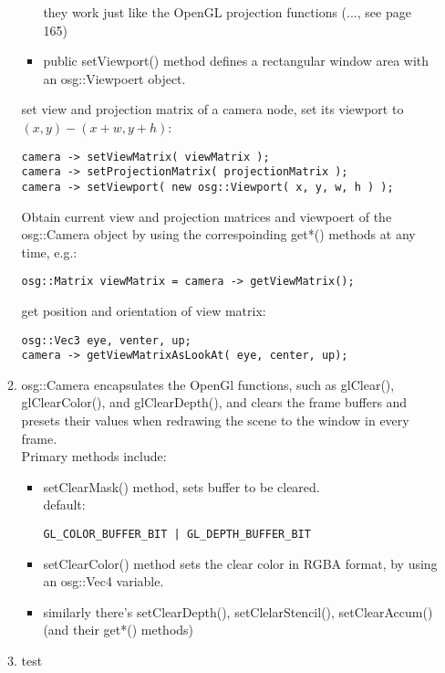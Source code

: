 \documentclass[a4paper,12pt]{book}
\begin{document}
\begin{itemize}
\begin{enumerate}
\begin{itemize}
they work just like the OpenGL projection functions (..., see page 165)
\item public setViewport() method defines a rectangular window area with an osg::Viewpoert object.
\end{itemize}
set view and projection matrix of a camera node, set its viewport to $(x,y) - (x+w, y+h)$:
\begin{lstlisting}
camera -> setViewMatrix( viewMatrix );
camera -> setProjectionMatrix( projectionMatrix );
camera -> setViewport( new osg::Viewport( x, y, w, h ) );
\end{lstlisting}
Obtain current view and projection matrices and viewpoert of the osg::Camera object by using the correspoinding get*() methods at any time, e.g.:
\begin{lstlisting}
osg::Matrix viewMatrix = camera -> getViewMatrix();
\end{lstlisting}
get position and orientation of view matrix:
\begin{lstlisting}
osg::Vec3 eye, venter, up;
camera -> getViewMatrixAsLookAt( eye, center, up);
\end{lstlisting}
\item osg::Camera encapsulates the OpenGl functions, such as glClear(), glClearColor(), and glClearDepth(), and clears the frame buffers and presets their values when redrawing the scene to the window in every frame.\\
Primary methods include:
\begin{itemize}
\item setClearMask() method, sets buffer to be cleared.\\default:
\begin{lstlisting}
GL_COLOR_BUFFER_BIT | GL_DEPTH_BUFFER_BIT
\end{lstlisting}

\item setClearColor() method sets the clear color in RGBA format, by using an osg::Vec4 variable.

\item similarly there's setClearDepth(), setClelarStencil(), setClearAccum() (and their get*() methods)
\end{itemize}

\item test


\end{enumerate}
\end{itemize}
\end{document}
